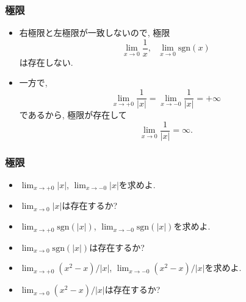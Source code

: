 

\begin{frame}
\frametitle{極限} 


\begin{itemize}
\item 右極限と左極限が一致しないので, 極限
$$
\lim_{x\to 0}\frac{1}{x}, \ \ \ \lim_{x\to0}\mathrm{sgn}(x)
$$
は存在しない. 
\item 一方で, 
$$
\lim_{x\to +0}\frac{1}{|x|}=\lim_{x\to -0}\frac{1}{|x|}=+\infty
$$
であるから, 極限が存在して
$$
\lim_{x\to 0}\frac{1}{|x|}=\infty. 
$$
\end{itemize}

\end{frame}




\begin{frame}
\frametitle{極限} 



\begin{Prob}
\begin{itemize}
\item $\displaystyle \lim_{x\to +0}|x|$, $\displaystyle \lim_{x\to -0}|x|$を求めよ. 
\item $\displaystyle \lim_{x\to0}|x|$は存在するか? 
\end{itemize}
\end{Prob}


\begin{Prob}
\begin{itemize}
\item $\displaystyle \lim_{x\to +0}\mathrm{sgn}(|x|)$,  $\displaystyle \lim_{x\to -0}\mathrm{sgn}(|x|)$を求めよ. 
\item $\displaystyle \lim_{x\to 0}\mathrm{sgn}(|x|)$は存在するか? 
\end{itemize}
\end{Prob}

\begin{Prob}
\begin{itemize}
\item $\displaystyle \lim_{x\to +0}(x^2-x)/|x|$,   $\displaystyle \lim_{x\to -0}(x^2-x)/|x|$を求めよ. 
\item $\displaystyle \lim_{x\to 0} (x^2-x)/|x|$は存在するか? 
\end{itemize}
\end{Prob}

\end{frame}



